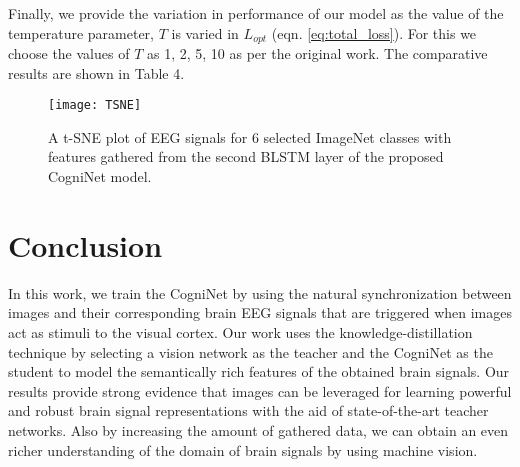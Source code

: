 \documentclass{article}
\begin{document}
Finally, we provide the variation in performance of our model as the value of the temperature parameter, $T$ is varied in  $L_{opt}$ (eqn. \ref{eq:total_loss}). For this we choose the values of $T$ as 1, 2, 5, 10 as per the original work. The comparative results are shown in Table 4.
\begin{figure}
    \centering
    \texttt{[image: TSNE]}
    \caption{A t-SNE plot of EEG signals for 6 selected ImageNet classes with features gathered from the second BLSTM layer of the proposed CogniNet model.}
    \label{fig:my_label}
\end{figure}

\section{Conclusion}

In this work, we train the CogniNet by using the natural synchronization between images and their corresponding brain EEG signals that are triggered when images act as stimuli to the visual cortex. Our work uses the knowledge-distillation technique by selecting a vision network as the teacher and the CogniNet as the student to model the semantically rich features of the obtained brain signals. Our results provide strong evidence that images can be leveraged for learning powerful and robust brain signal representations with the aid of state-of-the-art teacher networks. Also by increasing the amount of gathered data, we can obtain an even richer understanding of the domain of brain signals by using machine vision.



\end{document}
